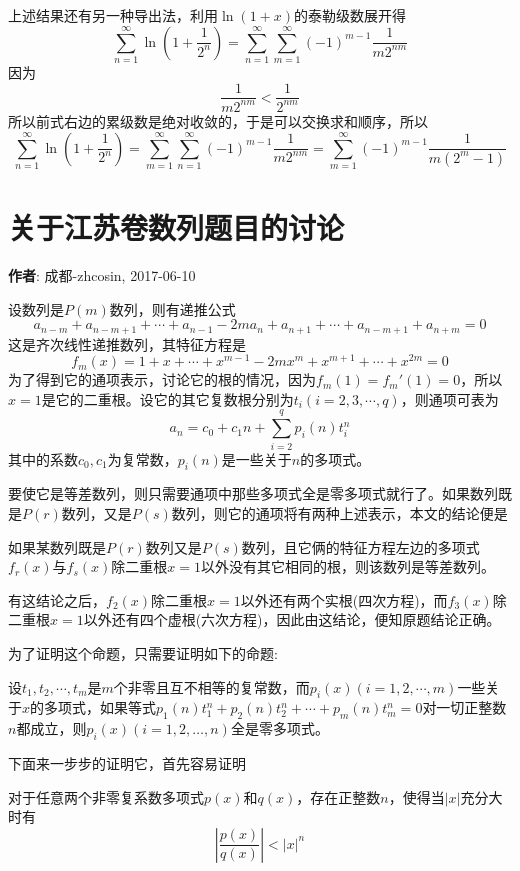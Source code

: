 \documentclass{ctexart}
\begin{document}
上述结果还有另一种导出法，利用$\ln{(1+x)}$的泰勒级数展开得
\[ \sum_{n=1}^{\infty} \ln{\left( 1+\frac{1}{2^n} \right)} = \sum_{n=1}^{\infty} \sum_{m=1}^{\infty} (-1)^{m-1} \frac{1}{m2^{nm}} \]
因为
\[ \frac{1}{m2^{nm}} < \frac{1}{2^{nm}} \]
所以前式右边的累级数是绝对收敛的，于是可以交换求和顺序，所以
\[ \sum_{n=1}^{\infty} \ln{\left( 1+\frac{1}{2^n} \right)} =  \sum_{m=1}^{\infty} \sum_{n=1}^{\infty}(-1)^{m-1} \frac{1}{m2^{nm}} = \sum_{m=1}^{\infty} (-1)^{m-1}\frac{1}{m(2^m-1)} \]

\section{关于江苏卷数列题目的讨论}
\label{sec:jiangshu-series-extend}

\textbf{作者}: 成都-zhcosin, 2017-06-10

  设数列是$P(m)$数列，则有递推公式
  \[ a_{n-m}+a_{n-m+1}+\cdots+a_{n-1}-2ma_n+a_{n+1}+\cdots+a_{n-m+1}+a_{n+m}=0 \]
  这是齐次线性递推数列，其特征方程是
  \[ f_m(x) = 1+x+\cdots+x^{m-1}-2mx^m+x^{m+1}+\cdots+x^{2m}=0 \]
  为了得到它的通项表示，讨论它的根的情况，因为$f_m(1)=f_m'(1)=0$，所以$x=1$是它的二重根。设它的其它复数根分别为$t_i(i=2,3,\cdots,q)$，则通项可表为
  \[ a_n=c_0+c_1 n + \sum_{i=2}^q p_i(n)t_i^n \]
  其中的系数$c_0,c_1$为复常数，$p_i(n)$是一些关于$n$的多项式。

  要使它是等差数列，则只需要通项中那些多项式全是零多项式就行了。如果数列既是$P(r)$数列，又是$P(s)$数列，则它的通项将有两种上述表示，本文的结论便是
  \begin{statement}
    如果某数列既是$P(r)$数列又是$P(s)$数列，且它俩的特征方程左边的多项式$f_r(x)$与$f_s(x)$除二重根$x=1$以外没有其它相同的根，则该数列是等差数列。
  \end{statement}
  有这结论之后，$f_2(x)$除二重根$x=1$以外还有两个实根(四次方程)，而$f_3(x)$除二重根$x=1$以外还有四个虚根(六次方程)，因此由这结论，便知原题结论正确。

  为了证明这个命题，只需要证明如下的命题:
\begin{statement}
  \label{statement:p-t-0}
    设$t_1,t_2,\cdots,t_m$是$m$个非零且互不相等的复常数，而$p_i(x)(i=1,2,\cdots,m)$一些关于$x$的多项式，如果等式$p_1(n)t_1^n+p_2(n)t_2^n+\cdots+p_m(n)t_m^n=0$对一切正整数$n$都成立，则$p_i(x)(i=1,2,\ldots,n)$全是零多项式。
\end{statement}

下面来一步步的证明它，首先容易证明
\begin{lemma}
  \label{lemma:ration-equation-bounded}
  对于任意两个非零复系数多项式$p(x)$和$q(x)$，存在正整数$n$，使得当$|x|$充分大时有
  \[ \left| \frac{p(x)}{q(x)} \right| < |x|^n \]
\end{lemma}
\end{document}
